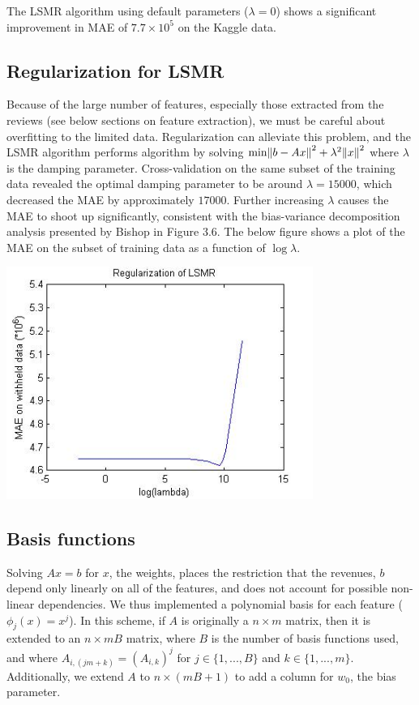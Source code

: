 \documentclass[11pt]{amsart}
\begin{document}
The LSMR algorithm using default parameters ($\lambda=0$) shows a significant improvement in MAE of $7.7\times10^5$ on the Kaggle data.

\subsection{Regularization for LSMR}
Because of the large number of features, especially those extracted from the reviews (see below sections on feature extraction), we must be careful about overfitting to the limited data. Regularization can alleviate this problem, and the LSMR algorithm performs algorithm by solving $\text{min}\norm{b-Ax}^2+\lambda^2\norm{x}^2$ where $\lambda$ is the damping parameter. Cross-validation on the same subset of the training data revealed the optimal damping parameter to be around $\lambda=15000$, which decreased the MAE by approximately $17000$. Further increasing $\lambda$ causes the MAE to shoot up significantly, consistent with the bias-variance decomposition analysis presented by Bishop in Figure 3.6. The below figure shows a plot of the MAE on the subset of training data as a function of $\log{\lambda}$.

\begin{center}
\includegraphics[width=10cm]{LSMR-Regularization.jpg}
\end{center}

\subsection{Basis functions}
Solving $Ax=b$ for $x$, the weights, places the restriction that the revenues, $b$ depend only linearly on all of the features, and does not account for possible non-linear dependencies. We thus implemented a polynomial basis for each feature ($\phi_j(x)=x^j$). In this scheme, if $A$ is originally a $n\times m$ matrix, then it is extended to an $n \times mB$ matrix, where $B$ is the number of basis functions used, and where $A_{i,(jm+k)}=(A_{i,k})^j$ for $j\in\{1,...,B\}$ and $k\in\{1,...,m\}$. Additionally, we extend $A$ to $n\times (mB+1)$ to add a column for $w_0$, the bias parameter.
\end{document}
